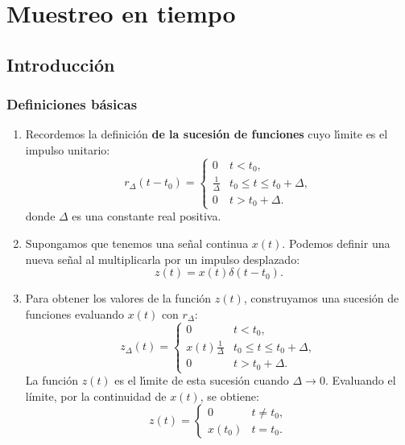 \chapter{Muestreo en tiempo}

\section{Introducci\'{o}n}

\subsection{Definiciones b\'{a}sicas}

\begin{enumerate}
	\item Recordemos la definici\'{o}n \textbf{de la sucesi\'{o}n de funciones} cuyo l\'{\i}mite es el impulso unitario:
	\begin{equation}
		r_{\Delta} (t - t_{0}) = 
		\begin{cases}
			0 & t < t_{0}, \\
			\frac{1}{\Delta} & t_{0} \leq t \leq t_{0} + \Delta, \\
			0 & t > t_{0} + \Delta.
		\end{cases}
	\end{equation}
	donde $\Delta$ es una constante real positiva.
	
	\item Supongamos que tenemos una se\~{n}al continua $x(t)$. Podemos definir una nueva se\~{n}al al multiplicarla por un impulso desplazado:
	\begin{equation}
		z(t) = x(t) \delta(t - t_{0}).
	\end{equation}
	
	\item Para obtener los valores de la funci\'{o}n $z(t)$, construyamos una sucesi\'{o}n de funciones evaluando $x(t)$ con $r_{\Delta}$:
	\begin{equation}
		z_{\Delta}(t) = 
		\begin{cases}
			0 & t < t_{0}, \\
			x(t) \frac{1}{\Delta} & t_{0} \leq t \leq t_{0} + \Delta, \\
			0 & t > t_{0} + \Delta.
		\end{cases}
	\end{equation}
	La funci\'{o}n $z(t)$ es el l\'{\i}mite de esta sucesi\'{o}n cuando $\Delta \rightarrow 0$. Evaluando el límite, por la continuidad de $x(t)$, se obtiene:
	\begin{equation}
		z(t) = 
		\begin{cases}
			0 & t \neq t_{0}, \\
			x(t_{0}) & t = t_{0}.
		\end{cases}             
		\label{muescont}
	\end{equation}
	

\end{enumerate}
